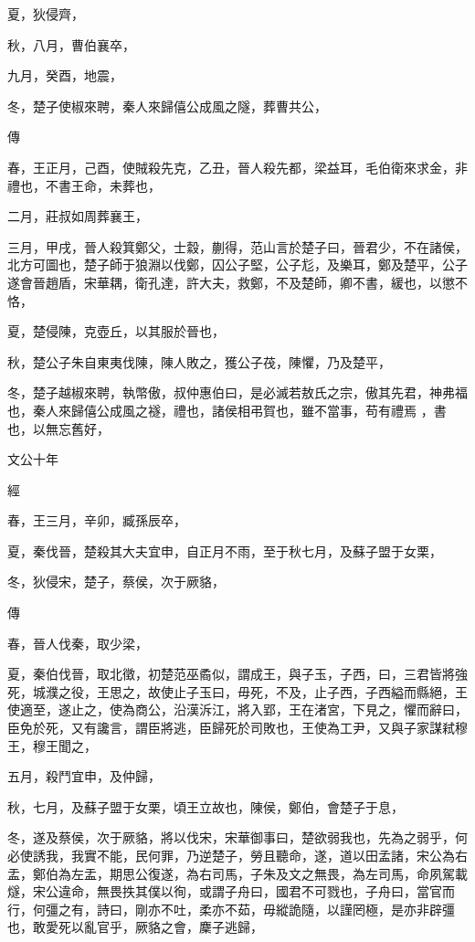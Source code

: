\documentclass[fontset = none]{ctexart}
\begin{document}
夏，狄侵齊，

秋，八月，曹伯襄卒，

九月，癸酉，地震，

冬，楚子使椒來聘，秦人來歸僖公成風之隧，葬曹共公，

傳



春，王正月，己酉，使賊殺先克，乙丑，晉人殺先都，梁益耳，毛伯衛來求金，非禮也，不書王命，未葬也，

二月，莊叔如周葬襄王，

三月，甲戌，晉人殺箕鄭父，士縠，蒯得，范山言於楚子曰，晉君少，不在諸侯，北方可圖也，楚子師于狼淵以伐鄭，囚公子堅，公子尨，及樂耳，鄭及楚平，公子遂會晉趙盾，宋華耦，衛孔達，許大夫，救鄭，不及楚師，卿不書，緩也，以懲不恪，

夏，楚侵陳，克壺丘，以其服於晉也，

秋，楚公子朱自東夷伐陳，陳人敗之，獲公子茷，陳懼，乃及楚平，

冬，楚子越椒來聘，執幣傲，叔仲惠伯曰，是必滅若敖氏之宗，傲其先君，神弗福也，秦人來歸僖公成風之襚，禮也，諸侯相弔賀也，雖不當事，苟有禮焉 ，書也，以無忘舊好，





文公十年


經



春，王三月，辛卯，臧孫辰卒，

夏，秦伐晉，楚殺其大夫宜申，自正月不雨，至于秋七月，及蘇子盟于女栗，

冬，狄侵宋，楚子，蔡侯，次于厥貉，

傳



春，晉人伐秦，取少梁，

夏，秦伯伐晉，取北徵，初楚范巫矞似，謂成王，與子玉，子西，曰，三君皆將強死，城濮之役，王思之，故使止子玉曰，毋死，不及，止子西，子西縊而縣絕，王使適至，遂止之，使為商公，沿漢泝江，將入郢，王在渚宮，下見之，懼而辭曰，臣免於死，又有讒言，謂臣將逃，臣歸死於司敗也，王使為工尹，又與子家謀弒穆王，穆王聞之，

五月，殺鬥宜申，及仲歸，

秋，七月，及蘇子盟于女栗，頃王立故也，陳侯，鄭伯，會楚子于息，

冬，遂及蔡侯，次于厥貉，將以伐宋，宋華御事曰，楚欲弱我也，先為之弱乎，何必使誘我，我實不能，民何罪，乃逆楚子，勞且聽命，遂，道以田孟諸，宋公為右盂，鄭伯為左盂，期思公復遂，為右司馬，子朱及文之無畏，為左司馬，命夙駕載燧，宋公違命，無畏抶其僕以徇，或謂子舟曰，國君不可戮也，子舟曰，當官而行，何彊之有，詩曰，剛亦不吐，柔亦不茹，毋縱詭隨，以謹罔極，是亦非辟彊也，敢愛死以亂官乎，厥貉之會，麇子逃歸，
\end{document}
